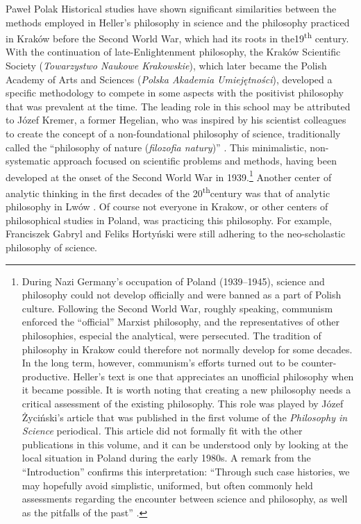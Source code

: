 \begin{artengenv}{Paweł Polak}
Historical studies have shown significant similarities between the methods employed in Heller’s philosophy in science
and the philosophy practiced in Kraków before the Second World War, which had its roots in the19\textsuperscript{th}
century. With the continuation of late-Enlightenment philosophy, the Kraków Scientific Society (\textit{Towarzystwo Naukowe
Krakowskie}), which later became the Polish Academy of Arts and Sciences (\textit{Polska Akademia Umiejętności}),
developed a specific methodology to compete in some aspects with the positivist philosophy that was prevalent at the
time. The leading role in this school may be attributed to Józef Kremer, a former Hegelian, who was inspired by his
scientist colleagues to create the concept of a non-foundational philosophy of science, traditionally called the
``philosophy of nature (\textit{filozofia natury})''
\parencite{pol_polak_miedzy_2019}.
This minimalistic, non-systematic approach focused on
scientific problems and methods, having been developed at the onset of the Second World War in 1939.\footnote{During
Nazi Germany’s occupation of Poland (1939–1945), science and philosophy could not develop officially and were banned as
a part of Polish culture. Following the Second World War, roughly speaking, communism enforced the ``official'' Marxist
philosophy, and the representatives of other philosophies, especial the analytical, were persecuted. The tradition of
philosophy in Krakow could therefore not normally develop for some decades. In the long term, however, communism’s
efforts turned out to be counter-productive. Heller’s text is one that appreciates an unofficial philosophy when it
became possible. It is worth noting that creating a new philosophy needs a critical assessment of the existing
philosophy. This role was played by Józef Życiński's article that was published in the first volume of the
\textit{Philosophy in Science }periodical\textit{.} This article did not formally fit with the other publications in
this volume, and it can be understood only by looking at the local situation in Poland during the early 1980s. A remark
from the ``Introduction'' confirms this interpretation: ``Through such case histories, we may hopefully avoid simplistic,
uniformed, but often commonly held assessments regarding the encounter between science and philosophy, as well as the
pitfalls of the past''
\parencite[p.19]{pol_heller_introduction_1983}.
} Another center of analytic
thinking in the first decades of the 20\textsuperscript{th}century was that of analytic philosophy in Lwów
\parencite{pol_polak_philosophy_2016,pol_wolenski_lvov-warsaw_2019}.
Of course not everyone in Krakow, or other centers of philosophical studies in Poland, was
practicing this philosophy. For example, Franciszek Gabryl and Feliks Hortyński were still adhering to the
neo-scholastic philosophy of science.


\end{artengenv}
